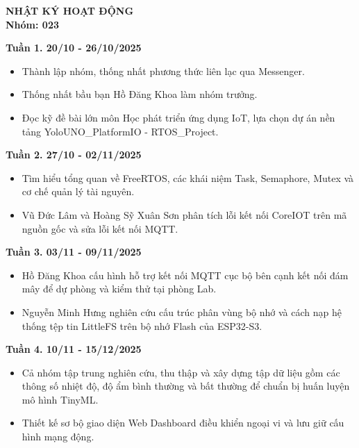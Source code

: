 \begin{center}
    \Large{\textbf{NHẬT KÝ HOẠT ĐỘNG}}\\
    \textbf{Nhóm: 023}
\end{center}
\textbf{Tuần 1. 20/10 - 26/10/2025}
\begin{itemize}
    \vspace{-.4cm}
    \item [-] Thành lập nhóm, thống nhất phương thức liên lạc qua Messenger.
    \vspace{-.4cm}
    \item [-] Thống nhất bầu bạn Hồ Đăng Khoa làm nhóm trưởng.
    \vspace{-.4cm}
    \item [-] Đọc kỹ đề bài lớn môn Học phát triển ứng dụng IoT, lựa chọn dự án nền tảng YoloUNO\_PlatformIO - RTOS\_Project.
\end{itemize}
\vspace{-.2cm}
\textbf{Tuần 2. 27/10 - 02/11/2025}
\begin{itemize}
    \vspace{-.4cm}
    \item [-] Tìm hiểu tổng quan về FreeRTOS, các khái niệm Task, Semaphore, Mutex và cơ chế quản lý tài nguyên.
    \vspace{-.4cm}
    \item [-] Vũ Đức Lâm và Hoàng Sỹ Xuân Sơn phân tích lỗi kết nối CoreIOT trên mã nguồn gốc và sửa lỗi kết nối MQTT.
\end{itemize}
\vspace{-.2cm}
\textbf{Tuần 3. 03/11 - 09/11/2025}
\begin{itemize}
    \vspace{-.4cm}
    \item [-] Hồ Đăng Khoa cấu hình hỗ trợ kết nối MQTT cục bộ bên cạnh kết nối đám mây để dự phòng và kiểm thử tại phòng Lab.
    \vspace{-.4cm}
    \item [-] Nguyễn Minh Hưng nghiên cứu cấu trúc phân vùng bộ nhớ và cách nạp hệ thống tệp tin LittleFS trên bộ nhớ Flash của ESP32-S3.
\end{itemize}
\vspace{-.2cm}
\textbf{Tuần 4. 10/11 - 15/12/2025}
\begin{itemize}
    \vspace{-.4cm}
    \item [-] Cả nhóm tập trung nghiên cứu, thu thập và xây dựng tập dữ liệu gồm các thông số nhiệt độ, độ ẩm bình thường và bất thường để chuẩn bị huấn luyện mô hình TinyML.
    \vspace{-.4cm}
    \item [-] Thiết kế sơ bộ giao diện Web Dashboard điều khiển ngoại vi và lưu giữ cấu hình mạng động.
\end{itemize}
